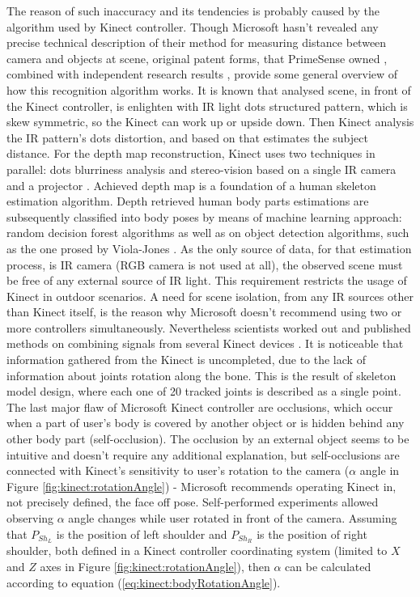 \documentclass[sensors,article,submit,moreauthors,pdftex,10pt,a4paper]{mdpi}
\begin{document}
The reason of such inaccuracy and its tendencies is probably caused by the algorithm used by Kinect controller. Though Microsoft hasn’t revealed any precise technical description of their method for measuring distance between camera and objects at scene, original patent forms, that PrimeSense owned \cite{patent:20100118123,patent:20100020078,patent:20080106746}, combined with independent research results \cite{reichinger2011}, provide some general overview of how this recognition algorithm works. It is known that analysed scene, in front of the Kinect controller, is enlighten with IR light dots structured pattern, which is skew symmetric, so the Kinect can work up or upside down. Then Kinect analysis the IR pattern’s dots distortion, and based on that estimates the subject distance. For the depth map reconstruction, Kinect uses two techniques in parallel: dots blurriness analysis \cite{Fofi2004} and stereo-vision based on a single IR camera and a projector \cite{Rzeszotarski2006}. 
Achieved depth map is a foundation of a human skeleton estimation algorithm. Depth retrieved human body parts estimations are subsequently classified into body poses by means of machine learning approach: random decision forest algorithms as well as on object detection algorithms, such as the one prosed by Viola-Jones \cite{Shotton2008, Shotton2011a}. 
As the only source of data, for that estimation process, is IR camera (RGB camera is not used at all), the observed scene must be free of any external source of IR light. This requirement restricts the usage of Kinect in outdoor scenarios. A need for scene isolation, from any IR sources other than Kinect itself, is the reason why Microsoft doesn't recommend using two or more controllers simultaneously. Nevertheless scientists worked out and published methods on combining signals from several Kinect devices \cite{Asteriadis2013, Kitsikidis2011, Schroder2011}.
It is noticeable that information gathered from the Kinect is uncompleted, due to the lack of information about joints rotation along the bone. This is the result of skeleton model design, where each one of 20 tracked joints is described as a single point.
The last major flaw of Microsoft Kinect controller are occlusions, which occur when a part of user’s body is covered by another object or is hidden behind any other body part (self-occlusion). The occlusion by an external object seems to be intuitive and doesn't require any additional explanation, but self-occlusions are connected with Kinect’s sensitivity to user’s rotation to the camera ($\alpha$ angle in Figure \ref{fig:kinect:rotationAngle}) - Microsoft recommends operating Kinect in, not precisely defined, the face off pose. Self-performed experiments allowed observing $\alpha$ angle changes while user rotated in front of the camera. Assuming that $P_{Sh_L}$ is the position of left shoulder and $P_{Sh_R}$ is the position of right shoulder, both defined in a Kinect controller coordinating system (limited to $X$ and $Z$ axes in Figure \ref{fig:kinect:rotationAngle}), then $\alpha$ can be calculated according to equation (\ref{eq:kinect:bodyRotationAngle}).
\end{document}
